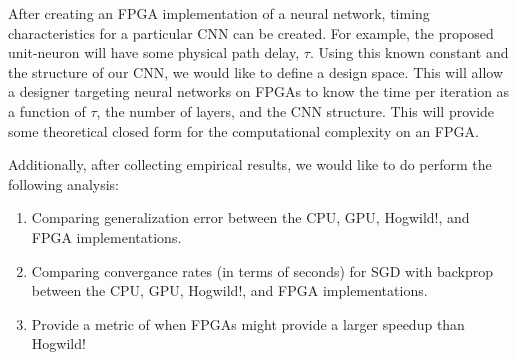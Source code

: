 After creating an FPGA implementation of a neural network, timing characteristics for a particular CNN can be created. For example, the proposed unit-neuron will have some physical path delay, $\tau$. Using this known constant and the structure of our CNN, we would like to define a design space. This will allow a designer targeting neural networks on FPGAs to know the time per iteration as a function of $\tau$, the number of layers, and the CNN structure. This will provide some theoretical closed form for the computational complexity on an FPGA.

Additionally, after collecting empirical results, we would like to do perform the following analysis:
\begin{enumerate}
	\item Comparing generalization error between the CPU, GPU, Hogwild!, and FPGA implementations.
	\item Comparing convergance rates (in terms of seconds) for SGD with backprop between the CPU, GPU, Hogwild!, and FPGA implementations.
	\item Provide a metric of when FPGAs might provide a larger speedup than Hogwild!
\end{enumerate}